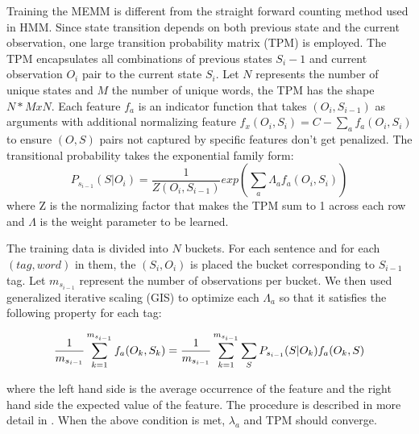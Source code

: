 Training the MEMM is different from the straight forward counting method used in HMM. Since state transition depends on both previous state and the current observation, one large transition probability matrix (TPM) is employed. The TPM encapsulates all combinations of previous states $S_i-1$ and current observation $O_i$ pair to the current state $S_i$. Let $N$ represents the number of unique states and $M$ the number of unique words, the TPM has the shape $N * M x N$. Each feature $f_a$ is an indicator function that takes $(O_i, S_{i-1})$ as arguments with additional normalizing feature $f_x(O_i, S_i) = C - \sum\limits_{a} f_a(O_i, S_i)$ to ensure $(O, S)$ pairs not captured by specific features don't get penalized. The transitional probability takes the exponential family form:
\vspace{-1em}
\begin{equation}
P_{s_{i-1}}(S | O_i) = \frac{1}{Z(O_i, S_{i-1})} exp(\sum\limits_{a}\Lambda_a f_a(O_i, S_i))
\end{equation}
where Z is the normalizing factor that makes the TPM sum to 1 across each row and $\Lambda$ is the weight parameter to be learned.

The training data is divided into $N$ buckets. For each sentence and for each $(tag, word)$ in them, the $(S_i, O_i)$ is placed the bucket corresponding to $S_{i-1}$ tag. Let $m_{s_{i-1}}$ represent the number of observations per bucket. We then used generalized iterative scaling (GIS) to optimize each $\Lambda_a$ so that it satisfies the following property for each tag:

\vspace{-1em}
\begin{equation}
\frac{1}{m_{s_{i-1}}}\sum\limits_{k=1}^{m_{s_{i-1}}} f_a(O_k, S_k) = \\ \frac{1}{m_{s_{i-1}}}\sum\limits_{k=1}^{m_{s_{i-1}}} \sum\limits_{S}P_{s_{i-1}}(S|O_k)f_a(O_k, S)
\end{equation}

where the left hand side is the average occurrence of the feature and the right hand side the expected value of the feature. The procedure is described in more detail in \cite{memmPaper}. When the above condition is met, $\lambda_a$ and TPM should converge.
